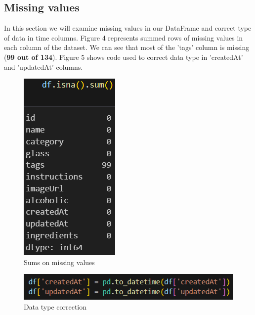 \documentclass[a4paper]{article}
\begin{document}
\subsection{Missing values}
In this section we will examine missing values in our DataFrame and correct type of data in time columns. Figure 4 represents summed rows of missing values in each column of the dataset. We can see that most of the 'tags' column is missing (\textbf{99 out of 134}). Figure 5 shows code used to correct data type in 'createdAt' and 'updatedAt' columns.
\vspace{2cm}

\begin{multicols}{2}

\begin{figure}[H]
    \centering
    \includegraphics[width=0.4\linewidth]{types.png}
    \caption{Sums on missing values}
    \label{fig:enter-label}
\end{figure}

\columnbreak

\begin{figure}[H]
    \centering
    \includegraphics[width=1\linewidth]{type correction.png}
    \caption{Data type correction}
    \label{fig:enter-label}
\end{figure}

\end{multicols}
\end{document}
